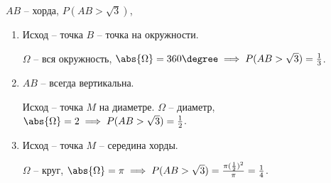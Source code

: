 \begin{eg}
  $AB$ -- хорда, $P(AB > \sqrt{3})$,
  \begin{figure}[H]
    \centering
    \label{fig:fig-6}
  \end{figure}

  \begin{enumerate}
    \item Исход -- точка $B$ -- точка на окружности.

    $\Omega$ -- вся окружность, $\abs{\Omega} = 360\degree \implies P(AB > \sqrt{3}) = \frac{1}{3}$.
    \begin{figure}[H]
      \centering
      \label{fig:fig-6}
    \end{figure}

    \item $AB$ -- всегда вертикальна.

    Исход -- точка $M$ на диаметре. $\Omega$ -- диаметр, $\abs{\Omega} = 2 \implies P(AB > \sqrt{3}) = \frac{1}{2}$.
    \begin{figure}[H]
      \centering
      \label{fig:fig-8}
    \end{figure}

    \item Исход -- точка $M$ -- середина хорды.

    $\Omega$ -- круг, $\abs{\Omega} = \pi \implies P(AB > \sqrt{3}) = \frac{\pi(\frac{1}{2})^2}{\pi} = \frac{1}{4}$.
    \begin{figure}[ht]
      \centering
      \label{fig:fig-9}
    \end{figure}
  \end{enumerate}
\end{eg}
